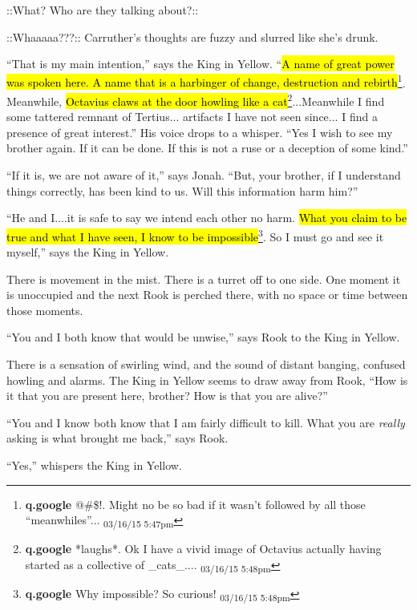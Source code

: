  {\color[RGB]{255,153,0}::What?  Who are they talking about?::} 

 {\color[RGB]{153,0,255}::Whaaaaa???:: }  Carruther's thoughts are fuzzy and slurred like she's drunk.

``That is my main intention,'' says the King in Yellow.  ``\hl{A name of great power was spoken here.  A name that is a harbinger of change, destruction and rebirth}\footnote{\textbf{q.google }@\#\$!.  Might no be so bad if it wasn't followed by all those ``meanwhiles''... \textsubscript{03/16/15 5:47pm}}.  Meanwhile, \hl{Octavius claws at the door howling like a cat}\footnote{\textbf{q.google }*laughs*.  Ok I have a vivid image of Octavius actually having started as a collective of \_cats\_.... \textsubscript{03/16/15 5:48pm}}...Meanwhile I find some tattered remnant of Tertius... artifacts I have not seen since... I find a presence of great interest.''  His voice drops to a whisper.  ``Yes I wish to see my brother again. If it can be done.  If this is not a ruse or a deception of some kind.''

``If it is, we are not aware of it,'' says Jonah.  ``But, your brother, if I understand things correctly, has been kind to us. Will this information harm him?''

``He and I....it is safe to say we intend each other no harm.  \hl{What you claim to be true and what I have seen, I know to be impossible}\footnote{\textbf{q.google }Why impossible?  So curious! \textsubscript{03/16/15 5:48pm}}. So I must go and see it myself,'' says the King in Yellow.





There is movement in the mist.  There is a turret off to one side.  One moment it is unoccupied and the next Rook is perched there, with no space or time between those moments. 

``You and I both know that would be unwise,'' says Rook to the King in Yellow. 



There is a sensation of swirling wind, and the sound of distant banging, confused howling and alarms.  The King in Yellow seems to draw away from Rook, ``How is it that you are present here, brother?  How is that you are alive?''

``You and I know both know that I am fairly difficult to kill.  What you are \textit{really} asking is what brought me back,'' says Rook.

``Yes,'' whispers the King in Yellow.

